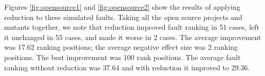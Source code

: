 Figures \ref{fig:opensource1} and \ref{fig:opensource2} show the
results of applying reduction to these simulated faults.  Taking all
the open source projects and mutants together, we note that reduction
improved fault ranking in 51 cases, left it unchanged in 55 cases, and
made it worse in 2 cases.  The average improvement was 17.62 ranking
positions; the average negative effect size was 2 ranking positions.
The best improvement was 100
rank positions.  The average fault ranking without
reduction was 37.64 and with reduction it improved to 29.36.  